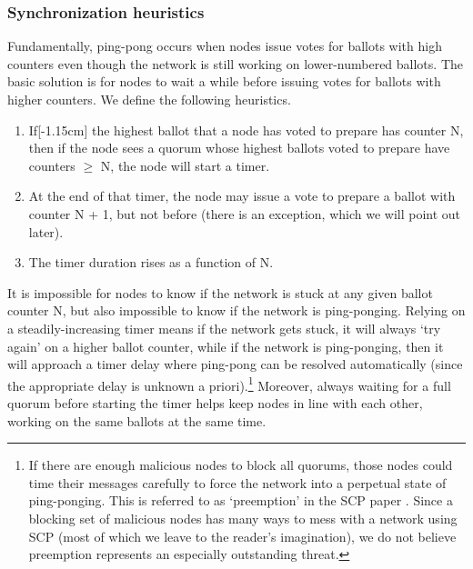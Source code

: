 \subsubsection{Synchronization heuristics}

Fundamentally, ping-pong occurs when nodes issue votes for ballots with high counters even though the network is still working on lower-numbered ballots. The basic solution is for nodes to wait a while before issuing votes for ballots with higher counters. We define the following heuristics.

\begin{enumerate}
    \item If[-1.15cm] the highest ballot that a node has voted to prepare has counter N, then if the node sees a quorum whose highest ballots voted to prepare have counters $\geq$ N, the node will start a timer.

    \item At the end of that timer, the node may issue a vote to prepare a ballot with counter N + 1, but not before (there is an exception, which we will point out later).

    \item The timer duration rises as a function of N.
\end{enumerate}

It is impossible for nodes to know if the network is stuck at any given ballot counter N, but also impossible to know if the network is ping-ponging. Relying on a steadily-increasing timer means if the network gets stuck, it will always `try again' on a higher ballot counter, while if the network is ping-ponging, then it will approach a timer delay where ping-pong can be resolved automatically (since the appropriate delay is unknown a priori).\footnote{If there are enough malicious nodes to block all quorums, those nodes could time their messages carefully to force the network into a perpetual state of ping-ponging. This is referred to as `preemption' in the SCP paper \cite{stellar-consensus-protocol}. Since a blocking set of malicious nodes has many ways to mess with a network using SCP (most of which we leave to the reader's imagination), we do not believe preemption represents an especially outstanding threat.} Moreover, always waiting for a full quorum before starting the timer helps keep nodes in line with each other, working on the same ballots at the same time.

